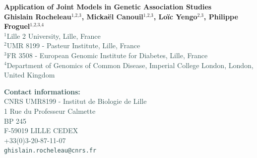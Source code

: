 \documentclass[a0,portrait]{a0poster}
\newcommand{\superscript}[1]{\ensuremath{^{\textrm{#1}}}}
\begin{document}
\Large

\begin{minipage}[t]{0.60\linewidth}
\flushleft
{\Huge \textcolor{ku}{\textbf{\mbox{Application} of \mbox{Joint} \mbox{Models} in \mbox{Genetic} \mbox{Association} \mbox{Studies}}}}\\ %
\vspace{1cm}
{\large \textbf{Ghislain Rocheleau\superscript{1,2,3}, Mickaël Canouil\superscript{1,2,3}, Loïc Yengo\superscript{2,3}, Philippe Froguel\superscript{1,2,3,4}}\\[0.5cm] %
\textcolor{DarkSlateGray}{
\superscript{1}Lille 2 University, Lille, France\\
\superscript{2}UMR 8199 - Pasteur Institute, Lille, France\\
\superscript{3}FR 3508 - European Genomic Institute for Diabetes, Lille, France\\
\superscript{4}Department of Genomics of Common Disease, Imperial College London, London, United Kingdom\\
}}
\end{minipage}
%
\begin{minipage}[t]{0.40\linewidth}
\flushright
\textcolor{DarkSlateGray}{
{\large \textbf{Contact informations:}\\
CNRS UMR8199 - Institut de Biologie de Lille\\
1 Rue du Professeur Calmette\\
BP 245\\
F-59019 LILLE CEDEX\\[1.5cm]
+33(0)3-20-87-11-07\\[0.20cm]
\texttt{ghislain.rocheleau@cnrs.fr}}
}
\end{minipage}

\end{document}
